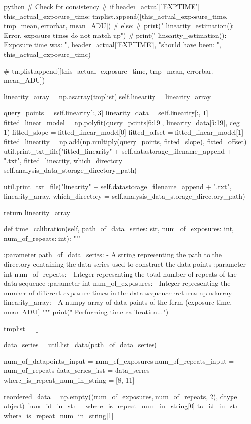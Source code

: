 \documentclass[../main.tex]{subfiles}
\begin{document}
\begin{mintedbox}{python}
# Check for consistency
# if header_actual['EXPTIME']  =  =  this_actual_exposure_time:
tmplist.append([this_actual_exposure_time, tmp_mean, errorbar, mean_ADU])
# else:
#    print("  linearity_estimation(): Error, exposure times do not match up")
#    print("  linearity_estimation(): Exposure time was: ", header_actual['EXPTIME'], "should have been: ", this_actual_exposure_time)

#    tmplist.append([this_actual_exposure_time, tmp_mean, errorbar, mean_ADU])

linearity_array  =  np.asarray(tmplist)
self.linearity  =  linearity_array

query_points  =  self.linearity[:, 3]
linearity_data  =  self.linearity[:, 1]
fitted_linear_model  =  np.polyfit(query_points[6:19], linearity_data[6:19], deg = 1)
fitted_slope  =  fitted_linear_model[0]
fitted_offset  =  fitted_linear_model[1]
fitted_linearity  =  np.add(np.multiply(query_points, fitted_slope), fitted_offset)
util.print_txt_file("fitted_linearity" + self.datastorage_filename_append + ".txt", fitted_linearity,
which_directory = self.analysis_data_storage_directory_path)

util.print_txt_file("linearity" + self.datastorage_filename_append + ".txt", linearity_array,
which_directory = self.analysis_data_storage_directory_path)

return linearity_array

def time_calibration(self, path_of_data_series: str, num_of_exposures: int, num_of_repeats: int):
"""

:parameter path_of_data_series:
- A string representing the path to the directory
containing the data series used to construct the data points
:parameter int num_of_repeats:
- Integer representing the total number of repeats of the data sequence
:parameter int num_of_exposures:
- Integer representing the number of different exposure times
in the data sequence
:returns np.ndarray linearity_array:
- A numpy array of data points of the form (exposure time, mean ADU)
"""
print(" Performing time calibration...")

tmplist  =  []

data_series  =  util.list_data(path_of_data_series)

num_of_datapoints_input  =  num_of_exposures
num_of_repeats_input  =  num_of_repeats
data_series_list  =  data_series
where_is_repeat_num_in_string  =  [8, 11]

reordered_data  =  np.empty((num_of_exposures, num_of_repeats, 2), dtype = object)
from_id_in_str  =  where_is_repeat_num_in_string[0]
to_id_in_str  =  where_is_repeat_num_in_string[1]


\end{mintedbox}
\end{document}
